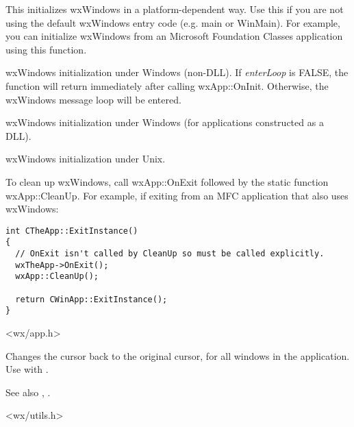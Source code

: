 This initializes wxWindows in a platform-dependent way. Use this if you
are not using the default wxWindows entry code (e.g. main or WinMain). For example,
you can initialize wxWindows from an Microsoft Foundation Classes application using
this function.


wxWindows initialization under Windows (non-DLL). If {\it enterLoop} is FALSE, the
function will return immediately after calling wxApp::OnInit. Otherwise, the wxWindows
message loop will be entered.


wxWindows initialization under Windows (for applications constructed as a DLL).


wxWindows initialization under Unix.


To clean up wxWindows, call wxApp::OnExit followed by the static function
wxApp::CleanUp. For example, if exiting from an MFC application that also uses wxWindows:

\begin{verbatim}
int CTheApp::ExitInstance()
{
  // OnExit isn't called by CleanUp so must be called explicitly.
  wxTheApp->OnExit();
  wxApp::CleanUp();

  return CWinApp::ExitInstance();
}
\end{verbatim}


<wx/app.h>

\label{wxendbusycursor}


Changes the cursor back to the original cursor, for all windows in the application.
Use with .

See also , .


<wx/utils.h>

